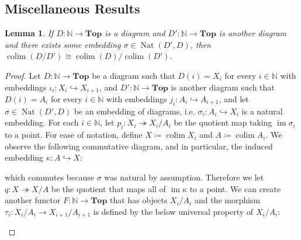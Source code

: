 \documentclass{article}
\newcommand{\N}{\mathbb{N}}
\newcommand{\Top}{\mathbf{Top}} %
\DeclareMathOperator{\im}{\mathrm{im}}
\DeclareMathOperator{\colim}{\mathrm{colim}}
\DeclareMathOperator{\Nat}{\mathrm{Nat}}
\newtheorem{lemma}[theorem]{Lemma}
\begin{document}
\subsection*{Miscellaneous Results}
\begin{lemma}
        If $D:\N \to \Top$ is a diagram and $D':\N \to \Top$ is another diagram and there exists some embedding $\sigma\in \Nat(D',D)$, then $\colim (D/D') \cong \colim (D)/\colim (D')$.
    \end{lemma}
    \begin{proof}
        Let $D:\N \to \Top$ be a diagram such that $D(i)=X_i$ for every $i\in \N$ with embeddings $\iota_i:X_i\hookrightarrow X_{i+1}$, and $D':\N \to \Top$ is another diagram such that $D(i)=A_i$ for every $i\in \N$  with embeddings $j_i:A_i\hookrightarrow A_{i+1}$, and let $\sigma \in \Nat(D',D)$ be an embedding of diagrams, i.e. $\sigma_i:A_i\hookrightarrow X_i$ is a natural embedding. For each $i\in \N$, let $p_i:X_i \twoheadrightarrow X_i/A_i$ be the quotient map taking $\im \sigma_i$ to a point. For ease of notation, define $X\coloneqq \colim X_i$ and $A\coloneqq \colim A_i$. We observe the following commutative diagram, and in particular, the induced embedding $\kappa:A\hookrightarrow X$:
        \begin{center}
    \end{center}
    which commutes because $\sigma$ was natural by assumption. Therefore we let $q:X\twoheadrightarrow X/A$ be the quotient that maps all of $\im \kappa$ to a point. We can create another functor $F:\N \to \Top$ that has objects $X_i/A_i$ and the morphism $\tau_i:X_i/A_i \to X_{i+1}/A_{i+1}$ is defined by the below universal property of $X_i/A_i:$
    \begin{center}
    \end{center}
    

\end{proof}
\end{document}
